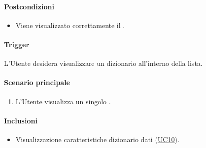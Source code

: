 \paragraph*{Postcondizioni}
\begin{itemize}
  \item Viene visualizzato correttamente il .
\end{itemize}

\paragraph*{Trigger}
L'Utente desidera visualizzare un dizionario all'interno della lista.

\paragraph*{Scenario principale}
\begin{enumerate}
  \item L'Utente visualizza un singolo .
\end{enumerate}

\paragraph*{Inclusioni}
\begin{itemize}
  \item Visualizzazione caratteristiche dizionario dati (\hyperref[UC10]{UC10}).
\end{itemize}